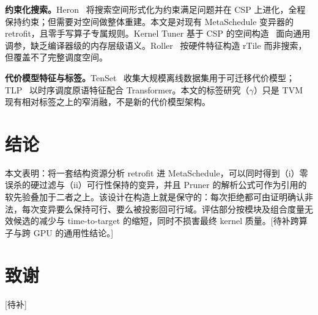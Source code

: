 \documentclass[UTF8]{ctexart}
\begin{document}
\textbf{约束化搜索。}Heron~\cite{heron} 将搜索空间形式化为约束满足问题并在 CSP 上进化，全程保持约束；但需要对空间做整体重建。本文是对现有 MetaSchedule 变异器的 retrofit，且零手写算子专属规则。Kernel Tuner 基于 CSP 的空间构造~\cite{kerneltuner} 面向通用调参，缺乏编译器级的内存层级语义。Roller~\cite{roller} 按硬件特征构造 rTile 而非搜索，但覆盖不了完整调度空间。

\textbf{代价模型特征与标签。}TenSet~\cite{tenset} 收集大规模离线数据集用于可迁移代价模型；TLP~\cite{tlp} 以时序调度原语特征配合 Transformer。本文的标签研究（$\gamma$）只是 TVM 现有相对标签之上的窄消融，不是新的代价模型架构。

\section{结论}
\label{sec:conclusion}

本文表明：将一套结构资源分析 retrofit 进 MetaSchedule，可以同时得到（i）零误杀的硬过滤与（ii）可行性保持的变异，并且 Pruner 的解析公式可作为引用的软先验叠加于二者之上。该设计在构造上就是保守的：每次拒绝都可由证明确认非法，每次变异要么保持可行、要么被投影回可行域。评估部分按模块及组合度量无效候选的减少与 time-to-target 的缩短，同时不损害最终 kernel 质量。[待补跨算子与跨 GPU 的通用性结论。]

\section*{致谢}
[待补]
\end{document}
